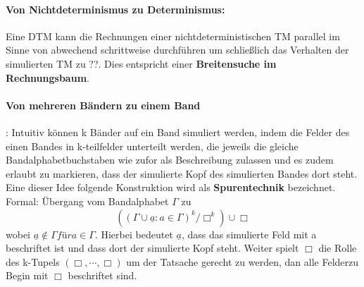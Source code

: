   \paragraph*{Von Nichtdeterminismus zu Determinismus:} 
    Eine DTM kann die Rechnungen einer nichtdeterministischen TM parallel im Sinne von abwechend schrittweise durchführen um schließlich das Verhalten der simulierten TM zu ??. Dies entspricht einer \textbf{Breitensuche im Rechnungsbaum}.
    {}
    \begin{center}
  
    \end{center}

    \paragraph{Von mehreren Bändern zu einem Band}: Intuitiv können k Bänder auf ein Band simuliert werden, indem die Felder des einen Bandes in k-teilfelder unterteilt werden, die jeweils die gleiche Bandalphabetbuchstaben wie zufor als Beschreibung zulassen und es zudem erlaubt zu markieren, dass der simulierte Kopf des simulierten Bandes dort steht. Eine dieser Idee folgende Konstruktion wird als \textbf{Spurentechnik} bezeichnet. Formal: Übergang vom Bandalphabet \(\Gamma\) zu 
    \[
      ((\Gamma \cup{\underline{a} : a \in \Gamma})^{k}/{\Box}^{k}) \cup {\Box}
    \] 
    wobei \(\underline{a} \not \in \Gamma für a \in \Gamma\). Hierbei bedeutet \(\underline{a}\), dass das simulierte Feld mit a beschriftet ist und dass dort der simulierte Kopf steht. Weiter spielt \(\Box\) die Rolle des k-Tupels \((\Box, \cdots, \Box)\) um der Tatsache gerecht zu werden, dan alle Felderzu Begin mit \(\Box\) beschriftet sind.
    
